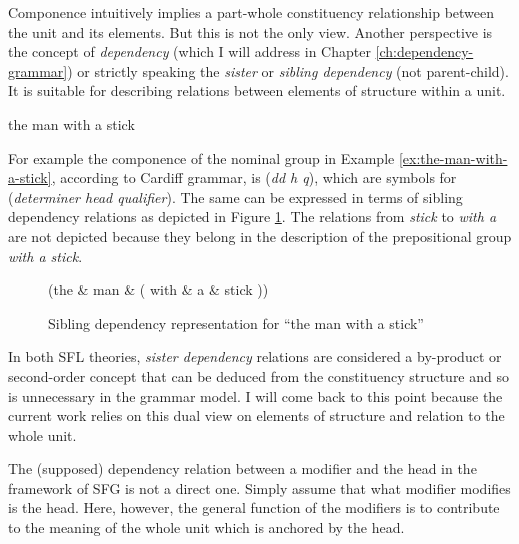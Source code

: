 Componence intuitively implies a part-whole constituency relationship between the unit and its elements. But this is not the only view. Another perspective is the concept of \textit{dependency} (which I will address in Chapter \ref{ch:dependency-grammar}) or strictly speaking the \textit{sister} or \textit{sibling dependency} (not parent-child). 
It is suitable for describing relations between elements of structure within a unit. 

\begin{exe}
    \ex\label{ex:the-man-with-a-stick} the man with a stick
\end{exe}

For example the componence of the nominal group in Example \ref{ex:the-man-with-a-stick}, according to Cardiff grammar, is (\textit{dd h q}), which are symbols for (\textit{determiner head qualifier}). The same can be expressed in terms of sibling dependency relations as depicted in Figure \ref{fig:dep-example-man-with-a-stick}. The relations from \textit{stick} to \textit{with a} are not depicted because they belong in the description of the prepositional group \textit{with a stick}.

\begin{figure}[!ht]
    \centering
    \begin{dependency}
        \begin{deptext}[column sep=1em]
            (the \& man \& ( with \& a \& stick )) \\
        \end{deptext}
    \end{dependency}
	\caption{Sibling dependency representation for ``the man with a stick''}
    \label{fig:dep-example-man-with-a-stick}
\end{figure}

In both SFL theories, \textit{sister dependency} relations are considered a by-product or second-order concept that can be deduced from the constituency structure and so is unnecessary in the grammar model. I will come back to this point because the current work relies on this dual view on elements of structure and relation to the whole unit. 

The (supposed) dependency relation between a modifier and the head in the framework of SFG is not a direct one. 
Simply assume that what modifier modifies is the head. Here, however, the general function of the modifiers is to contribute to the meaning of the whole unit which is anchored by the head. 

